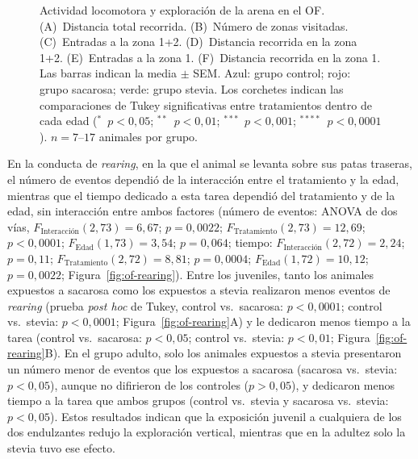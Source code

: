 \begin{figure}[htbp]
  \centering
  \caption[Actividad locomotora y exploración de la arena en el OF]{Actividad locomotora y exploración de la arena en el OF. (A)~Distancia total recorrida. (B)~Número de zonas visitadas. (C)~Entradas a la zona 1+2. (D)~Distancia recorrida en la zona 1+2. (E)~Entradas a la zona 1. (F)~Distancia recorrida en la zona 1. Las barras indican la media $\pm$ SEM. Azul: grupo control; rojo: grupo sacarosa; verde: grupo stevia. Los corchetes indican las comparaciones de Tukey significativas entre tratamientos dentro de cada edad ($^{*}$~$p < 0{,}05$; $^{**}$~$p < 0{,}01$; $^{***}$~$p < 0{,}001$; $^{****}$~$p < 0{,}0001$). $n = 7$--$17$ animales por grupo.}
  \label{fig:of-centro}
\end{figure}

\label{sec:res-of-rearing}En la conducta de \textit{rearing}, en la que el animal se levanta sobre sus patas traseras, el número de eventos dependió de la interacción entre el tratamiento y la edad, mientras que el tiempo dedicado a esta tarea dependió del tratamiento y de la edad, sin interacción entre ambos factores (número de eventos: ANOVA de dos vías, $F_{\text{Interacción}}(2, 73) = 6{,}67$; $p = 0{,}0022$; $F_{\text{Tratamiento}}(2, 73) = 12{,}69$; $p < 0{,}0001$; $F_{\text{Edad}}(1, 73) = 3{,}54$; $p = 0{,}064$; tiempo: $F_{\text{Interacción}}(2, 72) = 2{,}24$; $p = 0{,}11$; $F_{\text{Tratamiento}}(2, 72) = 8{,}81$; $p = 0{,}0004$; $F_{\text{Edad}}(1, 72) = 10{,}12$; $p = 0{,}0022$; Figura~\ref{fig:of-rearing}). Entre los juveniles, tanto los animales expuestos a sacarosa como los expuestos a stevia realizaron menos eventos de \textit{rearing} (prueba \textit{post hoc} de Tukey, control vs.\ sacarosa: $p < 0{,}0001$; control vs.\ stevia: $p < 0{,}0001$; Figura~\ref{fig:of-rearing}A) y le dedicaron menos tiempo a la tarea (control vs.\ sacarosa: $p < 0{,}05$; control vs.\ stevia: $p < 0{,}01$; Figura~\ref{fig:of-rearing}B). En el grupo adulto, solo los animales expuestos a stevia presentaron un número menor de eventos que los expuestos a sacarosa (sacarosa vs.\ stevia: $p < 0{,}05$), aunque no difirieron de los controles ($p > 0{,}05$), y dedicaron menos tiempo a la tarea que ambos grupos (control vs.\ stevia y sacarosa vs.\ stevia: $p < 0{,}05$). Estos resultados indican que la exposición juvenil a cualquiera de los dos endulzantes redujo la exploración vertical, mientras que en la adultez solo la stevia tuvo ese efecto.

